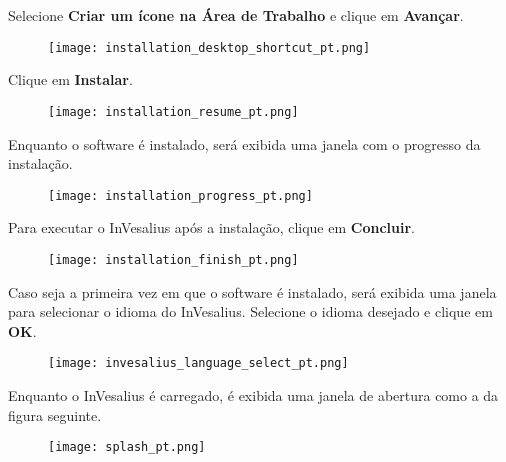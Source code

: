 \hspace{.2cm}

Selecione \textbf{Criar um ícone na Área de Trabalho} e clique em \textbf{Avançar}.

\begin{figure}[!htb]
\centering
\texttt{[image: installation\_desktop\_shortcut\_pt.png]}
\end{figure}

\newpage

Clique em \textbf{Instalar}.

\begin{figure}[!htb]
\centering
\texttt{[image: installation\_resume\_pt.png]}
\end{figure}

\hspace{.2cm}

Enquanto o software é instalado, será exibida uma janela com o progresso
da instalação.

\begin{figure}[!htb]
\centering
\texttt{[image: installation\_progress\_pt.png]}
\end{figure}

\newpage

Para executar o InVesalius após a instalação, clique em \textbf{Concluir}.

\begin{figure}[!htb]
\centering
\texttt{[image: installation\_finish\_pt.png]}
\end{figure}

\hspace{.2cm}

Caso seja a primeira vez em que o software é instalado, será exibida uma janela
para selecionar o idioma do InVesalius. Selecione o idioma desejado e clique em
\textbf{OK}.

\begin{figure}[!htb]
\centering
\texttt{[image: invesalius\_language\_select\_pt.png]}
\end{figure}

\newpage

Enquanto o InVesalius é carregado, é exibida uma janela de abertura como a da figura
seguinte.

\begin{figure}[!htb]
\centering
\texttt{[image: splash\_pt.png]}
\end{figure}

\hspace{.2cm}

